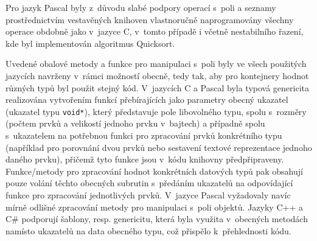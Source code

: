 \documentclass[czech,BP]{thesiskiv}
\begin{document}
Pro jazyk Pascal byly z~důvodu slabé podpory operací s~poli a seznamy prostřednictvím vestavěných knihoven vlastnoručně naprogramovány všechny operace obdobně jako v~jazyce C, v~tomto případě i včetně nestabilního řazení, kde byl implementován algoritmus Quicksort.\par
Uvedené obalové metody a funkce pro manipulaci s~poli byly ve všech použitých jazycích navrženy v~rámci možností obecně, tedy tak, aby pro kontejnery hodnot různých typů byl použit stejný kód. V~jazycích C a Pascal byla typová genericita realizována vytvořením funkcí přebírajících jako parametry obecný ukazatel (ukazatel typu \texttt{void*}), který představuje pole libovolného typu, spolu s~rozměry (počtem prvků a velikostí jednoho prvku v~bajtech) a případně spolu s~ukazatelem na potřebnou funkci pro zpracování prvků konkrétního typu (například pro porovnání dvou prvků nebo sestavení textové reprezentace jednoho daného prvku), přičemž tyto funkce jsou v~kódu knihovny předpřipraveny. Funkce/metody pro zpracování hodnot konkrétních datových typů pak obsahují pouze volání těchto obecných subrutin s~předáním ukazatelů na odpovídající funkce pro zpracování jednotlivých prvků. V~jazyce Pascal vyžadovaly navíc mírně odlišné zpracování metody pro manipulaci s~poli objektů. Jazyky C++ a C\# podporují šablony, resp. genericitu, která byla využita v~obecných metodách namísto ukazatelů na data obecného typu, což přispělo k~přehlednosti kódu.
\end{document}
